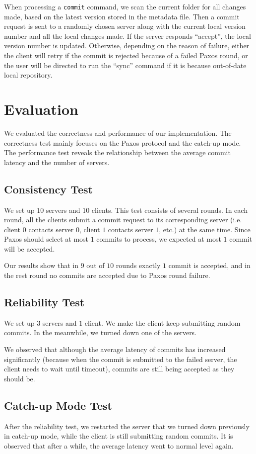 \documentclass[11pt]{article}
\begin{document}
When processing a \texttt{commit} command, we scan the current folder for all changes made, based on the latest version stored in the metadata file.
Then a commit request is sent to a randomly chosen server along with the current local version number and all the local changes made.
If the server responds ``accept'', the local version number is updated.
Otherwise, depending on the reason of failure, either the client will retry if the commit is rejected because of a failed Paxos round, or the user will be directed to run the ``sync'' command if it is because out-of-date local repository.

\section{Evaluation}
\label{sec:eval}
We evaluated the correctness and performance of our implementation.
The correctness test mainly focuses on the Paxos protocol and the catch-up mode.
The performance test reveals the relationship between the average commit latency and the number of servers.

\subsection{Consistency Test}
We set up $10$ servers and $10$ clients.
This test consists of several rounds.
In each round, all the clients submit a commit request to its corresponding server (i.e. client $0$ contacts server $0$, client $1$ contacts server $1$, etc.) at the same time.
Since Paxos should select at most $1$ commits to process, we expected at most $1$ commit will be accepted.

Our results show that in $9$ out of $10$ rounds exactly $1$ commit is accepted, and in the rest round no commits are accepted due to Paxos round failure.

\subsection{Reliability Test}
We set up $3$ servers and $1$ client.
We make the client keep submitting random commits.
In the meanwhile, we turned down one of the servers.

We observed that although the average latency of commits has increased significantly (because when the commit is submitted to the failed server, the client needs to wait until timeout), commits are still being accepted as they should be.

\subsection{Catch-up Mode Test}
After the reliability test, we restarted the server that we turned down previously in catch-up mode, while the client is still submitting random commits.
It is observed that after a while, the average latency went to normal level again.
\end{document}
